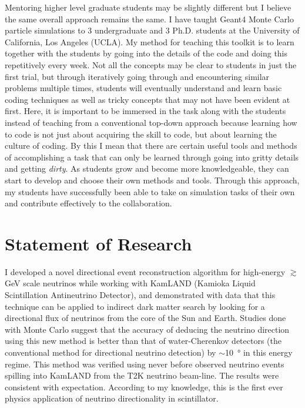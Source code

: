 \documentclass[10pt]{article} %
\begin{document}
Mentoring higher level graduate students may be slightly different but I
believe the same overall approach remains the same. I have taught Geant4 Monte
Carlo particle simulations to 3 undergraduate and 3 Ph.D. students at the
University of California, Los Angeles (UCLA). My method for teaching this
toolkit is to learn together with the students by going into the details of the
code and doing this repetitively every week. Not all the concepts may be clear
to students in just the first trial, but through iteratively going through and
encountering similar problems multiple times, students will eventually
understand and learn basic coding techniques as well as tricky concepts that
may not have been evident at first. Here, it is important to be immersed in the
task along with the students instead of teaching from a conventional top-down
approach because learning how to code is not just about acquiring the skill to
code, but about learning the culture of coding. By this I mean that there are
certain useful tools and methods of accomplishing a task that can only be
learned through going into gritty details and getting \textit{dirty}. As
students grow and become more knowledgeable, they can start to develop and
choose their own methods and tools. Through this approach, my students have
successfully been able to take on simulation tasks of their own and contribute
effectively to the collaboration.


\clearpage
\section{Statement of Research}

I developed a novel directional event reconstruction algorithm for high-energy
$\gtrsim$\si{\giga\electronvolt} scale neutrinos while working with KamLAND
(Kamioka Liquid Scintillation Antineutrino Detector), and demonstrated with
data that this technique can be applied to indirect dark matter search by
looking for a directional flux of neutrinos from the core of the Sun and Earth.
Studies done with Monte Carlo suggest that the accuracy of deducing the
neutrino direction using this new method is better than that of water-Cherenkov
detectors (the conventional method for directional neutrino detection) by
$\sim$\SI{10}{\degree} in this energy regime. This method was verified using
never before observed neutrino events spilling into KamLAND from the T2K
neutrino beam-line. The results were consistent with expectation. According to
my knowledge, this is the first ever physics application of neutrino
directionality in scintillator.
\end{document}
